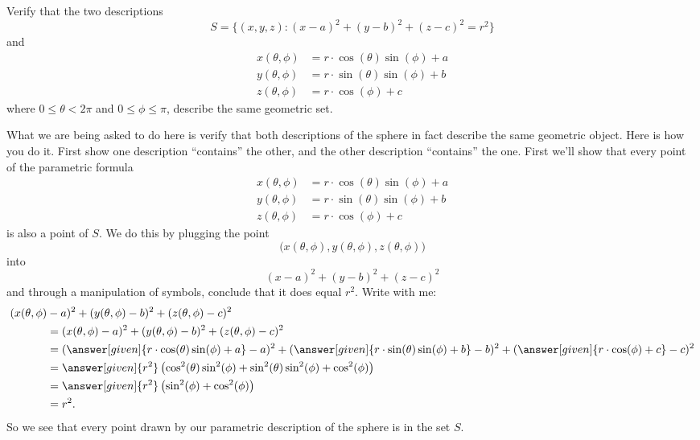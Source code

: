 \documentclass{ximera}
\begin{document}
\begin{example}
  Verify that the two descriptions
  \[
  S = \{(x,y,z):(x-a)^2+(y-b)^2+(z-c)^2=r^2\}
  \]
  and
  \begin{align*}
    x(\theta,\phi) &=r\cdot\cos(\theta)\sin(\phi)+a\\
    y(\theta,\phi) &=r\cdot\sin(\theta)\sin(\phi)+b\\
    z(\theta,\phi) &=r\cdot\cos(\phi)+c
  \end{align*}
  where $0\le \theta<2\pi$ and $0\le \phi\le \pi$, describe the same
  geometric set.
  \begin{explanation}
    What we are being asked to do here is verify that both
    descriptions of the sphere in fact describe the same geometric
    object.  Here is how you do it. First show one description
    ``contains'' the other, and the other description ``contains'' the
    one. First we'll show that every point of the parametric formula
    \begin{align*}
    x(\theta,\phi) &=r\cdot\cos(\theta)\sin(\phi)+a\\
    y(\theta,\phi) &=r\cdot\sin(\theta)\sin(\phi)+b\\
    z(\theta,\phi) &=r\cdot\cos(\phi)+c
    \end{align*}
    is also a point of $S$. We do this by plugging the point
    \[
    \big(x(\theta,\phi),y(\theta,\phi),z(\theta,\phi)\big)
    \]
    into 
    \[
    (x-a)^2+(y-b)^2+(z-c)^2
    \]
    and through a manipulation of symbols, conclude that it does equal
    $r^2$. Write with me:
    \begin{align*}
      (x(\theta,\phi)&-a)^2+(y(\theta,\phi)-b)^2+(z(\theta,\phi)-c)^2 \\
      &= (x(\theta,\phi)-a)^2+(y(\theta,\phi)-b)^2+(z(\theta,\phi)-c)^2\\
      &= (\answer[given]{r\cdot\cos(\theta)\sin(\phi)+a}-a)^2+(\answer[given]{r\cdot\sin(\theta)\sin(\phi)+b}-b)^2+(\answer[given]{r\cdot\cos(\phi)+c}-c)^2\\
      &= \answer[given]{r^2}\left(\cos^2(\theta)\sin^2(\phi) + \sin^2(\theta)\sin^2(\phi) + \cos^2(\phi)\right)\\
      &= \answer[given]{r^2}\left(\sin^2(\phi) + \cos^2(\phi)\right)\\
      &= r^2.
    \end{align*}
    So we see that every point drawn by our parametric description of
    the sphere is in the set $S$.


\end{explanation}
\end{example}
\end{document}
